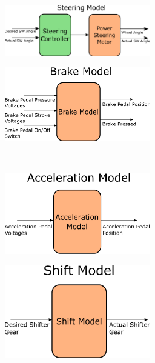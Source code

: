 \documentclass[letterpaper,12pt]{article}   %
\begin{document}
\begin{figure}[htb]
    \centering 
\begin{subfigure}[b]{0.48\linewidth}
  \centering 
  \includegraphics[width=2.5in]{figs/inkscape/steeringmodelarchitecture}
  \caption{}
  \label{fig:steeringmodelarchitecture}
\end{subfigure}
\begin{subfigure}[b]{0.48\linewidth}
  \centering
  \includegraphics[width=2.5in]{figs/inkscape/brakeModelArchitecture}
  \caption{}
  \label{fig:brakeModelArchitecture}
\end{subfigure}
\\
\begin{subfigure}[b]{0.48\textwidth}
  \centering 
  \includegraphics[width=2.5in]{figs/inkscape/accelerationModelArchitecture}
  \caption{}
  \label{fig:accelerationModelArchitecture}
\end{subfigure}
\begin{subfigure}[b]{0.48\linewidth}
  \centering 
  \includegraphics[width=2.5in]{figs/inkscape/shiftModelArchitecture}
  \caption{}
  \label{fig:shiftModelArchitecture}
\end{subfigure}

\end{figure}
\end{document}

